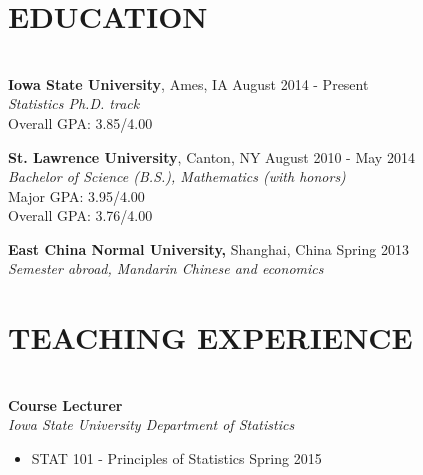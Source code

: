 \documentclass{res} %
\begin{document}
\begin{resume}


\section{EDUCATION}

\hrulefill \\ %
{\bf Iowa State University}, Ames, IA \hfill August 2014 - Present \\
{\sl Statistics Ph.D. track} \\
Overall GPA: 3.85/4.00

{\bf St. Lawrence University}, Canton, NY \hfill August 2010 - May 2014 \\
{\sl Bachelor of Science (B.S.), Mathematics (with honors)} \\
Major GPA: 3.95/4.00 \\
Overall GPA: 3.76/4.00 

{\bf East China Normal University,} Shanghai, China \hfill Spring 2013 \\
{\sl Semester abroad, Mandarin Chinese and economics} 





\section{TEACHING EXPERIENCE}

\hrulefill \\
{\bf Course Lecturer} \\
{\sl Iowa State University Department of Statistics}
\begin{itemize} \itemsep -2pt
\item STAT 101 - Principles of Statistics \hfill Spring 2015
\end{itemize}


\end{resume}
\end{document}
